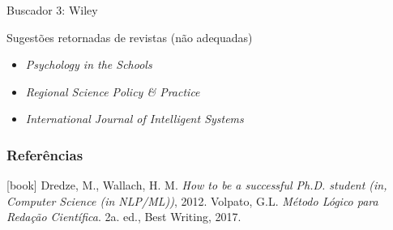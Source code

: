 \begin{frame}{Buscador 3: Wiley}
\begin{block}{Sugestões retornadas de revistas (não adequadas)}
\begin{itemize}
\item \emph{Psychology in the Schools} 
\item \emph{Regional Science Policy \& Practice}
\item \emph{International Journal of Intelligent Systems}
\end{itemize}
\end{block}
\end{frame}

\begin{frame}[allowframebreaks]
\frametitle{Referências}
\begin{thebibliography}{9}
[book]
%
Dredze, M., Wallach, H. M. \textit{How to be a successful Ph.D. student (in, Computer Science (in NLP/ML))}, 2012.
%
Volpato, G.L. \textit{Método Lógico para Redação Científica}. 2a. ed., Best Writing, 2017.
\end{thebibliography}
\end{frame}